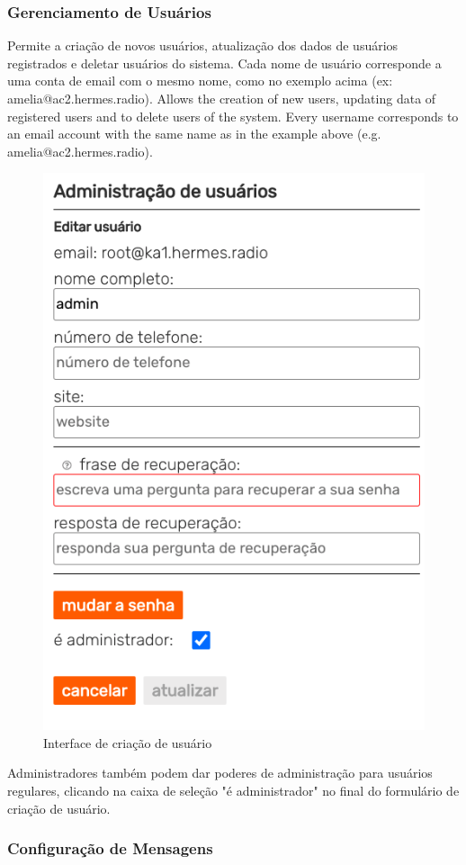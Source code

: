 \documentclass[11pt,a4paper]{article}
\begin{document}
\subsubsection{Gerenciamento de Usuários} 

Permite a criação de novos usuários, atualização dos dados de usuários registrados e deletar usuários do sistema. Cada nome de usuário corresponde a uma conta de email com o mesmo nome, como no exemplo acima (ex: amelia@ac2.hermes.radio).
Allows the creation of new users, updating data of registered users and to delete users of the system. Every username corresponds to an email account with the same name as in the example above (e.g. amelia@ac2.hermes.radio). 
    
    \begin{figure}[H]
    \centering
    \includegraphics[width=0.5\columnwidth]{screenshots/frontend/pt_kn/createuser.png}
    \caption{Interface de criação de usuário}
    \label{fig:createuser}
    \end{figure}
    
    Administradores também podem dar poderes de administração para usuários regulares, clicando na caixa de seleção "é administrador" no final do formulário de criação de usuário.

\subsubsection{Configuração de Mensagens}  
\label{gui_msg_admin}
\end{document}
